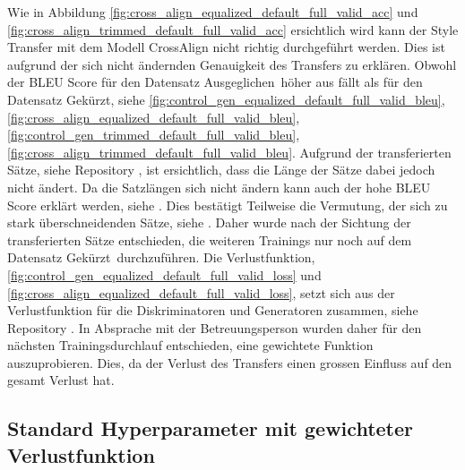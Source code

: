 Wie in Abbildung \ref{fig:cross_align_equalized_default_full_valid_acc} und
\ref{fig:cross_align_trimmed_default_full_valid_acc} ersichtlich wird kann der Style Transfer mit dem Modell
CrossAlign nicht richtig durchgeführt werden. Dies ist aufgrund der sich nicht ändernden Genauigkeit des Transfers
zu erklären. Obwohl der \gls{BLEU} Score für den Datensatz \flqq Ausgeglichen\frqq \ höher aus fällt als für den
Datensatz \flqq Gekürzt\frqq, siehe \ref{fig:control_gen_equalized_default_full_valid_bleu},
\ref{fig:cross_align_equalized_default_full_valid_bleu}, \ref{fig:control_gen_trimmed_default_full_valid_bleu},
\ref{fig:cross_align_trimmed_default_full_valid_bleu}. Aufgrund der transferierten Sätze, siehe Repository
, ist ersichtlich, dass die Länge der Sätze dabei jedoch nicht ändert. Da die Satzlängen sich
nicht ändern kann auch der hohe \gls{BLEU} Score erklärt werden, siehe . Dies bestätigt Teilweise die
Vermutung, der sich zu stark überschneidenden Sätze, siehe . Daher wurde nach der Sichtung
der transferierten Sätze entschieden, die weiteren Trainings nur noch auf dem Datensatz \flqq Gekürzt\frqq \
durchzuführen. 
\newline
\newline
Die Verlustfunktion, \ref{fig:control_gen_equalized_default_full_valid_loss} und
\ref{fig:cross_align_equalized_default_full_valid_loss}, setzt sich aus der Verlustfunktion für die Diskriminatoren und
Generatoren zusammen, siehe Repository \fullref{sub:gan}. In Absprache mit der Betreuungsperson wurden daher für
den nächsten Trainingsdurchlauf entschieden, eine gewichtete Funktion auszuprobieren. Dies, da der Verlust des
Transfers einen grossen Einfluss auf den gesamt Verlust hat.

\newpage

\subsection{Standard Hyperparameter mit gewichteter Verlustfunktion}
\label{sub:weighted_hyperparameter}

